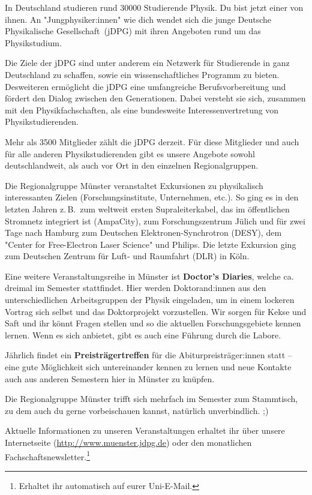 \begin{multicols}{2}
In Deutschland studieren rund \num{30000} Studierende Physik.
Du bist jetzt einer von ihnen.
An "Jungphysiker:innen" wie dich wendet sich die junge Deutsche Physikalische Gesellschaft~(jDPG) mit ihren Angeboten rund um das Physikstudium.

Die Ziele der jDPG sind unter anderem ein Netzwerk für Studierende in ganz Deutschland zu schaffen, sowie ein wissenschaftliches Programm zu bieten.
Desweiteren ermöglicht die jDPG eine umfangreiche Berufsvorbereitung und fördert den Dialog zwischen den Generationen.
Dabei versteht sie sich, zusammen mit den Physikfachschaften, als eine bundesweite Interessenvertretung von Physikstudierenden.

Mehr als \num{3500} Mitglieder zählt die jDPG derzeit.
Für diese Mitglieder und auch für alle anderen Physikstudierenden gibt es unsere Angebote sowohl deutschlandweit, als auch vor Ort in den einzelnen Regionalgruppen.

Die Regionalgruppe Münster veranstaltet Exkursionen zu physikalisch interessanten Zielen (Forschungsinstitute, Unternehmen, etc.).
So ging es in den letzten Jahren z.\,B.\ zum weltweit ersten Supraleiterkabel, das im öffentlichen Stromnetz integriert ist (AmpaCity), zum Forschungszentrum Jülich und für zwei Tage nach Hamburg zum Deutschen Elektronen-Synchrotron (DESY), dem "Center for Free-Electron Laser Science" und Philips. Die letzte Exkursion ging zum Deutschen Zentrum für Luft- und Raumfahrt (DLR) in Köln.

Eine weitere Veranstaltungsreihe in Münster ist \textbf{Doctor's Diaries}, welche ca. dreimal im Semester stattfindet. Hier werden Doktorand:innen aus den unterschiedlichen Arbeitsgruppen der Physik eingeladen, um in einem lockeren Vortrag sich selbst und das Doktorprojekt vorzustellen. Wir sorgen für Kekse und Saft und ihr könnt Fragen stellen und so die aktuellen Forschungsgebiete kennen lernen. Wenn es sich anbietet, gibt es auch eine Führung durch die Labore. 

Jährlich findet ein \textbf{Preisträgertreffen} für die Abiturpreisträger:innen statt -- eine gute Möglichkeit sich untereinander kennen zu lernen und neue Kontakte auch aus anderen Semestern hier in Münster zu knüpfen.


Die Regionalgruppe Münster trifft sich mehrfach im Semester zum Stammtisch, zu dem auch du gerne vorbeischauen kannst, natürlich unverbindlich. ;)


Aktuelle Informationen zu unseren Veranstaltungen erhaltet ihr über unsere Internetseite (\url{http://www.muenster.jdpg.de}) oder den monatlichen Fachschaftsnewsletter.\footnote{Erhaltet ihr automatisch auf eurer Uni-E-Mail.} 


\end{multicols}
